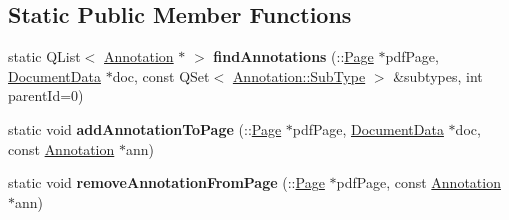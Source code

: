\subsection*{Static Public Member Functions}
\begin{DoxyCompactItemize}
\item 
\mbox{\label{class_poppler_1_1_annotation_private_a2b8bf3fa1b6f6f7ef3a989edd66bda87}} 
static Q\+List$<$ \hyperlink{class_poppler_1_1_annotation}{Annotation} $\ast$ $>$ {\bfseries find\+Annotations} (\+::\hyperlink{class_poppler_1_1_page}{Page} $\ast$pdf\+Page, \hyperlink{class_poppler_1_1_document_data}{Document\+Data} $\ast$doc, const Q\+Set$<$ \hyperlink{class_poppler_1_1_annotation_a2d592999c330949d64679cfa9e81113f}{Annotation\+::\+Sub\+Type} $>$ \&subtypes, int parent\+Id=0)
\item 
\mbox{\label{class_poppler_1_1_annotation_private_a8c64ed352ab8a3dcf5d12fa560f33295}} 
static void {\bfseries add\+Annotation\+To\+Page} (\+::\hyperlink{class_poppler_1_1_page}{Page} $\ast$pdf\+Page, \hyperlink{class_poppler_1_1_document_data}{Document\+Data} $\ast$doc, const \hyperlink{class_poppler_1_1_annotation}{Annotation} $\ast$ann)
\item 
\mbox{\label{class_poppler_1_1_annotation_private_ad9211713656e5df134844bfc8558f6b2}} 
static void {\bfseries remove\+Annotation\+From\+Page} (\+::\hyperlink{class_poppler_1_1_page}{Page} $\ast$pdf\+Page, const \hyperlink{class_poppler_1_1_annotation}{Annotation} $\ast$ann)
\end{DoxyCompactItemize}
